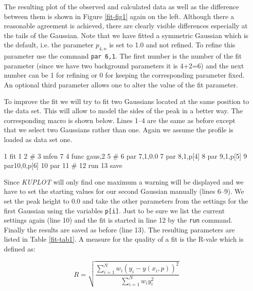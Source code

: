 The resulting plot of the observed and calculated data as well as
the difference between them is shown in Figure \ref{fit-fig1} again
on the left. Although there a reasonable agreement is achieved,
there are clearly visible differences especially at the tails of the
Gaussian. Note that we have fitted a symmetric Gaussian which is the
default, i.e. the parameter $p_{4,n}$ is set to 1.0 and not refined.
To refine this parameter use the command {\tt par 6,1}. The first
number is the number of the fit parameter (since we have two
background parameters it is 4+2=6) and the next number can be 1 for
refining or 0 for keeping the corresponding parameter fixed. An
optional third parameter allows one to alter the value of the fit
parameter. \par

To improve the fit we will try to fit two Gaussians located at the
same position to the data set. This will allow to model the sides of
the peak in a better way. The corresponding macro is shown below.
Lines 1--4 are the same as before except that we select two Gaussians
rather than one. Again we assume the profile is loaded as data set
one.

\begin{MacVerbatim}
     1  fit 1
     2  #
     3  mfen 7
     4  func gaus,2
     5  #
     6  par 7,1,0.0
     7  par 8,1,p[4]
     8  par 9,1,p[5]
     9  par10,0,p[6]
    10  par
    11  #
    12  run
    13  save
\end{MacVerbatim}
\normalsize

Since {\it KUPLOT} will only find one maximum a warning will be
displayed and we have to set the starting values for our second
Gaussian manually (lines 6--9). We set the peak height to 0.0 and
take the other parameters from the settings for the first Gaussian
using the variables {\tt p[i]}. Just to be sure we list the current
settings again (line 10) and the fit is started in line 12 by the
{\tt run} command. Finally the results are saved as before (line
13). The resulting parameters are listed in Table \ref{fit-tab1}. A
measure for the quality of a fit is the R-vale which is defined as:

\begin{equation}
    R=\sqrt{\frac{\sum\limits_{i=1}^{N} w_{i} (y_{i} - y(x_{i},p))^{2}}
                 {\sum\limits_{i=1}^{N} w_{i} y_{i}^{2}}}
    \label{fit-1d-eq-R}
\end{equation}

